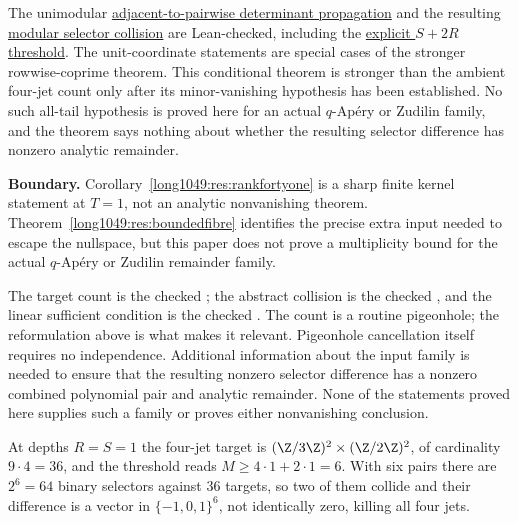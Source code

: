 \noindent The unimodular
\href{https://github.com/wcook04/plectis-erdos/blob/0cfa24a7fe555d75a9d9e7f119da4720a88c1396/ErdosProblems/Erdos1049/BezoutPluckerJets.lean\#L191}{adjacent-to-pairwise determinant propagation}
and the resulting
\href{https://github.com/wcook04/plectis-erdos/blob/0cfa24a7fe555d75a9d9e7f119da4720a88c1396/ErdosProblems/Erdos1049/BezoutPluckerJets.lean\#L280}{modular selector collision}
are Lean-checked, including the
\href{https://github.com/wcook04/plectis-erdos/blob/0cfa24a7fe555d75a9d9e7f119da4720a88c1396/ErdosProblems/Erdos1049/BezoutPluckerJets.lean\#L299}{explicit $S+2R$ threshold}.
The unit-coordinate statements are special cases of the stronger
rowwise-coprime theorem.
This conditional theorem is stronger than the ambient four-jet count only
after its minor-vanishing hypothesis has been established.  No such all-tail
hypothesis is proved here for an actual $q$-Ap\'ery or Zudilin family, and the
theorem says nothing about whether the resulting selector difference has
nonzero analytic remainder.

\noindent\textbf{Boundary.}
Corollary~\ref{long1049:res:rankfortyone} is a sharp finite kernel statement at
$T=1$, not an analytic nonvanishing theorem.  Theorem~\ref{long1049:res:boundedfibre}
identifies the precise extra input needed to escape the nullspace, but this
paper does not prove a multiplicity bound for the actual $q$-Ap\'ery or
Zudilin remainder family.

\noindent The target count is the checked
; the abstract collision is the checked
, and the linear sufficient condition is the checked
.  The count is a routine pigeonhole; the reformulation
above is what makes it relevant.  Pigeonhole cancellation itself requires no
independence.  Additional information about the input family is needed to
ensure that the resulting nonzero selector difference has a nonzero combined
polynomial pair and analytic remainder.  None of the statements proved here
supplies such a family or proves either nonvanishing conclusion.

\begin{example}\label{long1049:ex:jetcount}
At depths \(R=S=1\) the four-jet target is
\((\Z/3\Z)^2\times(\Z/2\Z)^2\), of cardinality \(9\cdot4=36\), and the threshold
reads \(M\ge4\cdot1+2\cdot1=6\).  With six pairs there are \(2^{6}=64\) binary
selectors against \(36\) targets, so two of them collide and their difference
is a vector in \(\{-1,0,1\}^{6}\), not identically zero, killing all four jets.
\end{example}

